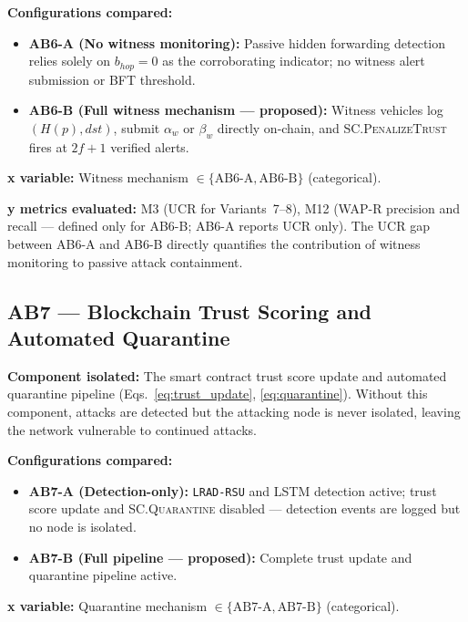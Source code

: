 \documentclass[12pt, a4paper]{report}
\begin{document}
{{\textbf{Configurations compared:}
\begin{itemize}
    \item \textbf{AB6-A (No witness monitoring):}
    Passive hidden forwarding detection relies solely
    on $b_{hop} = 0$ as the corroborating indicator;
    no witness alert submission or BFT threshold.
    \item \textbf{AB6-B (Full witness mechanism —
    proposed):} Witness vehicles log $(H(p), dst)$,
    submit $\alpha_w$ or $\beta_w$ directly on-chain,
    and \textsc{SC.PenalizeTrust} fires at $2f{+}1$
    verified alerts.
\end{itemize}

\textbf{x variable:} Witness mechanism
$\in \{\text{AB6-A}, \text{AB6-B}\}$ (categorical).

\textbf{y metrics evaluated:} M3 (UCR for Variants~7--8),
M12 (WAP-R precision and recall — defined only for
AB6-B; AB6-A reports UCR only). The UCR gap between
AB6-A and AB6-B directly quantifies the contribution
of witness monitoring to passive attack containment.


\subsection{AB7 — Blockchain Trust Scoring and
Automated Quarantine}
\label{sec:ab7}

\textbf{Component isolated:}
The smart contract trust score update and automated
quarantine pipeline (Eqs.~\ref{eq:trust_update},
\ref{eq:quarantine}). Without this component,
attacks are detected but the attacking node is never
isolated, leaving the network vulnerable to continued
attacks.

\textbf{Configurations compared:}
\begin{itemize}
    \item \textbf{AB7-A (Detection-only):}
    \texttt{LRAD-RSU} and \ac{LSTM} detection active;
    trust score update and \textsc{SC.Quarantine}
    disabled — detection events are logged but no
    node is isolated.
    \item \textbf{AB7-B (Full pipeline — proposed):}
    Complete trust update and quarantine pipeline active.
\end{itemize}

\textbf{x variable:} Quarantine mechanism
$\in \{\text{AB7-A}, \text{AB7-B}\}$ (categorical).

}}
\end{document}
